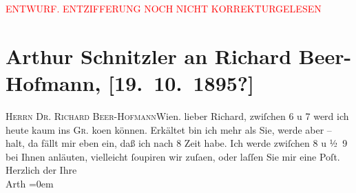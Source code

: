 
\begin{center}
            \textcolor{red}{ENTWURF. ENTZIFFERUNG NOCH NICHT KORREKTURGELESEN}
                      \end{center}
            
               \section[Arthur Schnitzler an Richard Beer-Hofmann, {[}19. 10. 1895?{]}]{ Arthur Schnitzler an Richard Beer-Hofmann, {[}19. 10. 1895?{]}}\nopagebreak{}\rehead{ }\begin{ledgroupsized}[t]{13cm}\normalsize\beginnumbering{} \toendnotes[C]{\smallbreak\pagebreak[2]} 
\pstart{}{\pb}\textsc{Herrn Dr. Richard
                     Beer-Hofmann}\pend{}\pstart{}Wien.\pend{}{\bigskip}\pstart
           \noindent{}{\pb}lieber Richard, zwiſchen
                  6 u 7 werd ich heute kaum ins \textsc{Gr.} ko{\geminationm}en
               können. Erkältet bin ich mehr als Sie, werde aber – halt, da fällt mir eben ein, daß
               ich nach 8 Zeit habe. Ich werde zwiſchen 8 u
                  ½ 9 bei {\pb}Ihnen anläuten,
               vielleicht ſoupiren wir zuſa{\geminationm}en, oder laſſen Sie mir
               eine Poſt.\pend
           \pstart
           Herzlich der Ihre{\\[\baselineskip]}\spacefill\mbox{Arth}\pend
           \leftskip=0em{}\endnumbering{}\end{ledgroupsized}  \newcommand{\dateiname}{L00510}\newcommand{\titel}{Arthur Schnitzler an Richard Beer-Hofmann, [19. 10. 1895?]}\newcommand{\editorInnen}{Martin Anton Müller und Gerd-Hermann Susen}
      